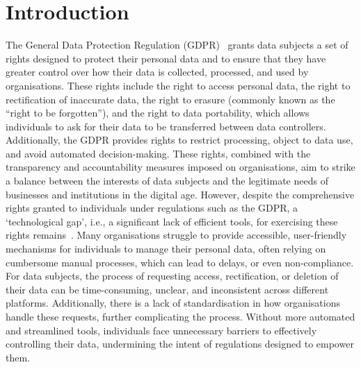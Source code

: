 \documentclass{IOS-Book-Article}     %
\begin{document}
\section{Introduction}
\label{sec:intro}

The General Data Protection Regulation (GDPR)~\cite{gdpr} grants data subjects a set of rights designed to protect their personal data and to ensure that they have greater control over how their data is collected, processed, and used by organisations.
These rights include the right to access personal data, the right to rectification of inaccurate data, the right to erasure (commonly known as the ``right to be forgotten''), and the right to data portability, which allows individuals to ask for their data to be transferred between data controllers.
Additionally, the GDPR provides rights to restrict processing, object to data use, and avoid automated decision-making.
These rights, combined with the transparency and accountability measures imposed on organisations, aim to strike a balance between the interests of data subjects and the legitimate needs of businesses and institutions in the digital age.
However, despite the comprehensive rights granted to individuals under regulations such as the GDPR, a `technological gap', i.e., a significant lack of efficient tools, for exercising these rights remains~\cite{bernes_enhancing_2022}.
Many organisations struggle to provide accessible, user-friendly mechanisms for individuals to manage their personal data, often relying on cumbersome manual processes, which can lead to delays, or even non-compliance.
For data subjects, the process of requesting access, rectification, or deletion of their data can be time-consuming, unclear, and inconsistent across different platforms.
Additionally, there is a lack of standardisation in how organisations handle these requests, further complicating the process.
Without more automated and streamlined tools, individuals face unnecessary barriers to effectively controlling their data, undermining the intent of regulations designed to empower them.
\end{document}
